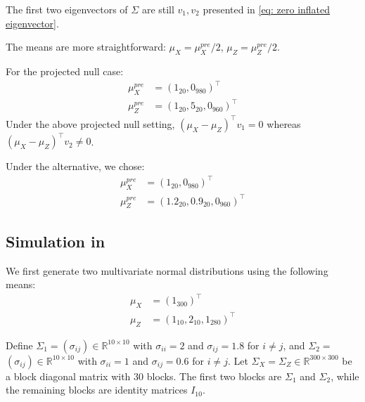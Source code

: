 \documentclass[11pt]{article}
\begin{document}
The first two eigenvectors of $\Sigma$ are still $v_1,v_2$ presented in \eqref{eq: zero inflated eigenvector}.

The means are more straightforward: $\mu_X = \mu^{pre}_X/2$, $\mu_Z = \mu^{pre}_Z/2$.



For the projected null case:
$$
\begin{aligned}
    \mu_X^{pre}  & = (1_{20}, 0_{980})^\top \\
    \mu_Z^{pre}  & = (1_{20}, 5_{20}, 0_{960})^\top
\end{aligned}
$$
Under the above projected null setting, $(\mu_X - \mu_Z)^\top v_1 = 0$ whereas $(\mu_X - \mu_Z)^\top v_2 \neq 0$. 

Under the alternative, we chose:
$$
\begin{aligned}
    \mu_X^{pre}  & = (1_{20}, 0_{980})^\top \\
    \mu_Z^{pre}  & = (1.2_{20}, 0.9_{20}, 0_{960})^\top
\end{aligned}
$$

\subsection{Simulation in }\label{app: simulation truncated normal}

We first generate two multivariate normal distributions using the following means:
$$
    \begin{aligned}
        \mu_X & = (1_{300})^\top\\
        \mu_Z & = (1_{10}, 2_{10}, 1_{280})^\top
    \end{aligned}
$$

Define $\Sigma_1=\left(\sigma_{i j}\right) \in \mathbb{R}^{10 \times 10}$ with $\sigma_{i i}=2$ and $\sigma_{i j}=1.8$ for $i \neq j$, and $\Sigma_2=$ $\left(\sigma_{i j}\right) \in \mathbb{R}^{10 \times 10}$ with $\sigma_{i i}=1$ and $\sigma_{i j}=0.6$ for $i \neq j$.
Let $\Sigma_X=\Sigma_Z \in \mathbb{R}^{300 \times 300}$ be a block diagonal matrix with 30 blocks. The first two blocks are $\Sigma_1$ and $\Sigma_2$, while the remaining blocks are identity matrices $I_{10}$.
\end{document}
